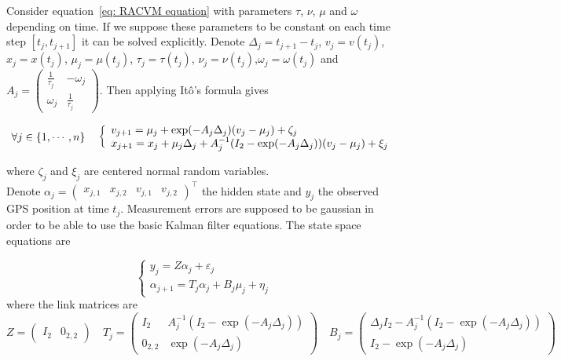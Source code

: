 \documentclass[11pt]{article}
\newcommand {\1}{\mathbb{1}}
\begin{document}
Consider equation~\ref{eq: RACVM equation} with parameters $\tau$, $\nu$, $\mu$ and $\omega$ depending on time.
If we suppose these parameters to be constant on each time step $[t_j,t_{j+1}]$ it can be solved explicitly. Denote $\Delta_j=t_{j+1}-t_j$, $v_j=v(t_j)$, $x_j=x(t_j)$, $\mu_j=\mu(t_j)$, $\tau_j=\tau(t_j)$, $\nu_j=\nu(t_j)$,$\omega_j=\omega(t_j)$ and $A_j=\begin{pmatrix} 
	\frac{1}{\tau_j} & -\omega_j \\
	\omega_j & \frac{1}{\tau_j}
\end{pmatrix}$. Then applying Itô's formula gives

\begin{equation}
	\forall j \in \{1, \cdots, n\} \quad 
	\left\{ \begin{array}{l}
		v_{j+1}=\mu_j +\exp(-A_j\Delta_j)(v_j-\mu_j)+\zeta_j \\
		x_{j+1}=x_j+\mu_j \Delta_j+A_j^{-1}(I_2-\exp(-A_j\Delta_j))(v_j-\mu_j)+\xi_j
	\end{array}\right. \\
	\label{eq: RCVM autoregressive formula}
\end{equation}


where $\zeta_j$ and $\xi_j$ are centered normal random variables.\\
Denote $\alpha_j=\begin{pmatrix} x_{j,1}  & x_{j,2} & v_{j,1} & v_{j,2}\end{pmatrix}^\top$ the hidden state and $y_j$ the observed GPS position at time $t_j$. Measurement errors are supposed to be gaussian in order to be able to use the basic Kalman filter equations. The state space equations are

\[
\left\{
\begin{array}{l}
	y_j=Z\alpha_j+\varepsilon_j \\
	\alpha_{j+1}=T_j \alpha_j+B_j \mu_j + \eta_j
\end{array}
\right.\]
where the link matrices are 
\[Z=\begin{pmatrix} I_2 & 0_{2,2}\end{pmatrix} \quad  T_j=\begin{pmatrix} I_2 & A_j^{-1}(I_2-\exp(-A_j \Delta_j)) \\ 0_{2,2} & \exp(-A_j \Delta_j) \end{pmatrix} \quad B_j=\begin{pmatrix}
	\Delta_j I_2-A_j^{-1}(I_2-\exp(-A_j\Delta_j)) \\
	I_2-\exp(-A_j\Delta_j)\end{pmatrix}
\]
\end{document}
